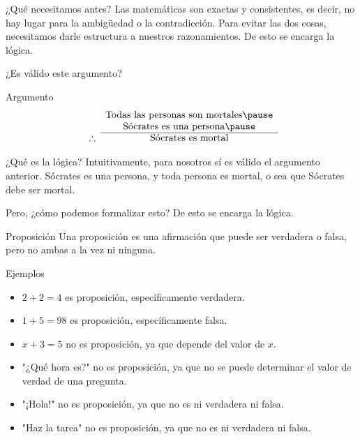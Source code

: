 \documentclass[dvisvgm,hypertex,aspectratio=169]{beamer}
\begin{document}
\begin{frame}{¿Qué necesitamos antes?}
  Las matemáticas son exactas y consistentes, es decir, no hay lugar para la
  ambigüedad o la contradicción. \pause{}Para evitar las dos cosas, necesitamos darle
  estructura a nuestros razonamientos. De esto se encarga la \alert{lógica}.
\end{frame}
\begin{frame}{¿Es válido este argumento?}
  \begin{block}{Argumento}
    \pause
    \[
    \begin{array}{ c c }
      &\text{Todas las personas son mortales} \pause\\
      &\text{Sócrates es una persona} \pause\\
      \cline{2-2}
      \therefore &\text{Sócrates es mortal}
    \end{array}
    \]
  \end{block}
\end{frame}
\begin{frame}{¿Qué es la lógica?}
  Intuitivamente, para nosotros sí es válido el argumento anterior. Sócrates es una persona, y toda persona es mortal, o sea que Sócrates debe ser mortal.

  \pause Pero, ¿cómo podemos formalizar esto? De esto se encarga la lógica.
\end{frame}
\begin{frame}{Proposición}
  Una proposición es una afirmación que puede ser verdadera o falsa, pero no ambas a la vez ni ninguna.

  \begin{block}{Ejemplos}
    \begin{itemize}
      \item $2+2=4$ es proposición, específicamente verdadera.
      \item $1+5=98$ es proposición, específicamente falsa.
      \item $x+3=5$ no es proposición, ya que depende del valor de $x$.
      \item "¿Qué hora es?" no es proposición, ya que no se puede determinar el valor de verdad de una pregunta.
      \item "¡Hola!" no es proposición, ya que no es ni verdadera ni falsa.
      \item "Haz la tarea" no es proposición, ya que no es ni verdadera ni falsa.
    \end{itemize}
  \end{block}
\end{frame}
\end{document}
